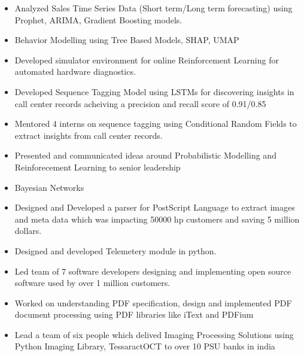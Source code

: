 \documentclass[10pt,a4paper,ragged2e,withhyper]{altacv}
\begin{document}
\begin{paracol}{1}
\par\divider
{}

\begin{itemize}
\item Analyzed Sales Time Series Data (Short term/Long term forecasting) using
Prophet, ARIMA, Gradient Boosting models.
\item Behavior Modelling using Tree Based Models, SHAP, UMAP
\item Developed simulator environment for online Reinforcement Learning for
automated hardware diagnostics.
\item Developed Sequence Tagging Model using LSTMs for discovering insights in
call center records acheiving a precision and recall score of 0.91/0.85
\item Mentored 4 interns on sequence tagging using Conditional Random Fields to
extract insights from call center records.
\item Presented and communicated ideas around Probabilistic Modelling and
Reinforecement Learning to senior leadership
\item Bayesian Networks
\end{itemize}


\newpage
\par\divider
{}
\begin{itemize}
\item Designed and Developed a parser for PostScript Language to extract images and
meta data which was impacting 50000 hp customers and saving 5 million dollars.
\item Designed and developed Telemetery module in python.
\item Led team of 7 software developers designing and implementing open source
software used by over 1 million customers.
\item Worked on understanding PDF specification, design and implemented PDF document
processing using PDF libraries like iText and PDFium
\item Lead a team of six people which delived Imaging Processing Solutions using
Python Imaging Library, TessaractOCT to over 10 PSU banks in india
\end{itemize}


\end{paracol}
\end{document}
